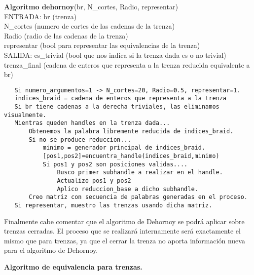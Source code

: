 \newpage
\begin{alg}
	\textbf{Algoritmo dehornoy}(br, N\_cortes, Radio, representar)\\
	ENTRADA: br (trenza)\\
	\hspace*{2.2cm} N\_cortes (numero de cortes de las cadenas de la trenza)\\
	\hspace*{2.2cm} Radio (radio de las cadenas de la trenza)\\
	\hspace*{2.2cm} representar (bool para representar las equivalencias de la trenza)\\
	SALIDA: \hspace{0.4cm} es\_trivial (bool que nos indica si la trenza dada es o no trivial) \\
	\hspace*{2.2cm} trenza\_final (cadena de enteros que representa a la trenza reducida equivalente a br)
	
\begin{lstlisting}
   Si numero_argumentos=1 -> N_cortes=20, Radio=0.5, representar=1.
   indices_braid = cadena de enteros que representa a la trenza
   Si br tiene cadenas a la derecha triviales, las eliminamos visualmente.
   Mientras queden handles en la trenza dada...
	   Obtenemos la palabra libremente reducida de indices_braid.
	   Si no se produce reduccion...
		   minimo = generador principal de indices_braid.
		   [pos1,pos2]=encuentra_handle(indices_braid,minimo)
		   Si pos1 y pos2 son posiciones validas....
			   Busco primer subhandle a realizar en el handle.
			   Actualizo pos1 y pos2
			   Aplico reduccion_base a dicho subhandle.
	   Creo matriz con secuencia de palabras generadas en el proceso.
   Si representar, muestro las trenzas usando dicha matriz.			   
\end{lstlisting}
\end{alg}

Finalmente cabe comentar que el algoritmo de Dehornoy se podrá aplicar sobre trenzas cerradas. El proceso que se realizará internamente será exactamente el mismo que para trenzas, ya que el cerrar la trenza no aporta información nueva para el algoritmo de Dehornoy. \\

\bigskip
\begin{center}
	\textbf{Algoritmo de equivalencia para trenzas.}
\end{center} 

